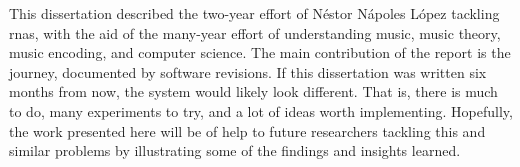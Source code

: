
This dissertation described the two-year effort of N\'estor
N\'apoles L\'opez tackling \glspl{rna}, with the aid of the
many-year effort of understanding music, music theory, music
encoding, and computer science. The main contribution of the
report is the journey, documented by software revisions. If
this dissertation was written six months from now, the
system would likely look different. That is, there is much
to do, many experiments to try, and a lot of ideas worth
implementing. Hopefully, the work presented here will be of
help to future researchers tackling this and similar
problems by illustrating some of the findings and insights
learned.
